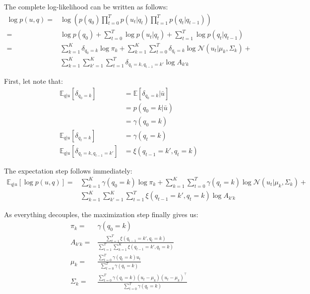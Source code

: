 \documentclass{article}
\begin{document}

The complete log-likelihood can be written as follows:
\begin{align*}
\log p(u,q) =& \log \left( p(q_0) \prod_{t=0}^T p(u_t|q_t) \prod_{t=1}^T p(q_t|q_{t-1})\right)\\
=& \log p(q_0) + \sum_{t=0}^T \log p(u_t|q_t) + \sum_{t=1}^T \log p(q_t|q_{t-1})\\
=& \sum_{k=1}^K \delta_{q_0 = k} \log \pi_k + \sum_{k=1}^K \sum_{t=0}^T \delta_{q_t = k} \log \mathcal{N}(u_t| \mu_k, \Sigma_k) + \\
&\sum_{k=1}^K \sum_{k'=1}^K \sum_{t=1}^T \delta_{q_t = k, q_{t-1}=k'} \log A_{k'k}
\end{align*}

First, let note that:
\begin{align*}
\mathbb{E}_{q|u}[\delta_{q_0 = k}] &= \mathbb{E}[\delta_{q_0 = k} | \bar{u}]\\
&= p(q_0 = k | \bar{u})\\
&=\gamma(q_0=k)\\
\mathbb{E}_{q|u}[\delta_{q_t = k}] &= \gamma(q_t=k)\\
\mathbb{E}_{q|u}[\delta_{q_t = k, q_{t-1}=k'}] &= \xi(q_{t-1}=k', q_t=k)
\end{align*}

The expectation step follows immediately:
\begin{align*}
\mathbb{E}_{q|u}[\log p(u,q)] =& \sum_{k=1}^K \gamma(q_0=k) \log \pi_k + \sum_{k=1}^K \sum_{t=0}^T \gamma(q_t=k) \log \mathcal{N}(u_t| \mu_k, \Sigma_k) + \\
&\sum_{k=1}^K \sum_{k'=1}^K \sum_{t=1}^T \xi(q_{t-1}=k', q_t=k) \log A_{k'k}
\end{align*}

As everything decouples, the maximization step finally gives us:
\begin{align*}
\pi_k =& \gamma(q_0=k)\\
A_{k'k} =& \frac{\sum_{t=1}^T \xi(q_{t-1}=k', q_t=k)}{\sum_{t=1}^T \sum_{k=1}^K \xi(q_{t-1}=k', q_t=k)}\\
\mu_k =& \frac{\sum_{t=0}^T \gamma(q_t = k) u_t}{\sum_{t=0}^T \gamma(q_t = k)}\\
\Sigma_k =& \frac{ \sum_{t=0}^T \gamma(q_t = k) (u_t - \mu_k)(u_t - \mu_k)^\intercal}{\sum_{t=0}^T \gamma(q_t = k)}
\end{align*}

\end{document}
